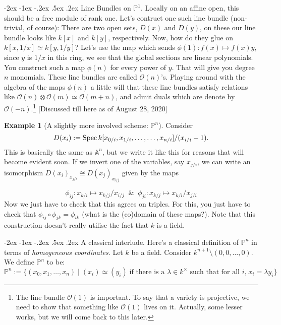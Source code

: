\documentclass[11pt]{amsart}
\makeatletter
\renewcommand\subsection{\@startsection {subsection}{1}{\z@}%
	{-2ex \@plus -1ex \@minus -.2ex}%
	{.5ex \@plus.2ex}%
	{\normalfont\bfseries}}
\newcommand{\Spec}{{\rm Spec \,}}
\newcommand{\sO}{{\mathcal O}}
\newcommand{\A}{{\mathbb A}}
\renewcommand{\P}{{\mathbb P}}
\theoremstyle{definition}
\newtheorem{example}[theorem]{Example}
\makeatother
\begin{document}
\subsection{Line Bundles on \texorpdfstring{$\P^1$}{P1}.}
\label{P1-line-bundles}
 Locally on an affine open, this should be a free module of rank one. Let's contruct one such line bundle (non-trivial, of course): There are two open sets, $D(x)$ and $D(y)$, on these our line bundle looks like $k[x]$ and $k[y]$, respectively. Now, how do they glue on $k[x,1/x]\simeq k[y,1/y]$? Let's use the map which sends $\phi(1):f(x)\mapsto f(x)y$, since $y$ is $1/x$ in this ring, we see that the global sections are linear polynomials. You construct such a map $\phi(n)$ for every power of $y$. That will give you degree $n$ monomials. These line bundles are called $\sO(n)$'s. Playing around with the algebra of the maps $\phi(n)$ a little will that these line bundles satisfy relations like $\sO(n)\otimes\sO(m)\simeq \sO(m+n)$, and admit duals which are denote by $\sO(-n)$.\footnote{The line bundle $\sO(1)$ is important. To say that a variety is projective, we need to show that something like $\sO(1)$ lives on it. Actually, some lesser works, but we will come back to this later.}
[Discussed till here as of August 28, 2020]


\begin{example}[A slightly more involved scheme: \texorpdfstring{$\P^n$}{Pn}]\label{example-projective-space}
Consider 
\[D(x_i):= \Spec k[x_{0/i},x_{1/i},\ldots,\ldots,x_{n/i}]/(x_{i/i}-1).\]
This is basically the same as $\A^n$, but we write it like this for reasons that will become evident soon. If we invert one of the variables, say $x_{j/i}$, we can write an isomorphism $D(x_i)_{x_{j/i}}\cong D(x_j)_{x_{i/j}}$ given by the maps 

\[\phi_{ij}:x_{k/i}\mapsto x_{k/j}/x_{i/j}\;\; \&\;\; \phi_{ji}:x_{k/j}\mapsto x_{k/i}/x_{j/i}\]
Now we just have to check that this agrees on triples. For this, you just have to check that $\phi_{ij}\circ\phi_{jk}=\phi_{ik}$ (what is the (co)domain of these maps?). Note that this construction doesn't really utilise the fact that $k$ is a field.
\end{example}

\subsection{A classical interlude.}\label{subsection-homogeneous-coordinates}
Here's a classical definition of $\P^n$ in terms of \textit{homogeneous coordinates}. Let $k$ be a field. Consider $k^{n+1}\setminus{(0,0,\ldots,0)}$. We define $\P^n$ to be:
\[\P^n:=\lbrace (x_0,x_1,\ldots,x_n)\; |\; (x_i)\simeq (y_i)\; \text{if there is a $\lambda\in k^{\times}$ such that for all $i$,}\; x_i=\lambda y_i\rbrace\]
\end{document}
